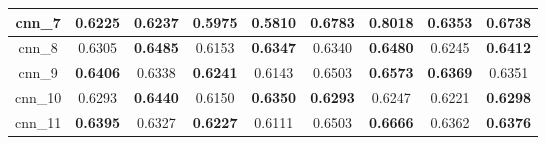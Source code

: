 \begin{table}[hp]
\begin{tabular} {|c|c|c|c|c|c|c|c|c| }
        cnn\_7   & 0.6225                              & \textbf{0.6237}                     & \textbf{0.5975}                     & 0.5810                              & 0.6783                              & \textbf{\cellcolor{green!50}0.8018} & 0.6353                              & \textbf{0.6738}                     \\ \hline
        cnn\_8   & 0.6305                              & \textbf{0.6485}                     & 0.6153                              & \textbf{0.6347}                     & 0.6340                              & \textbf{0.6480}                     & 0.6245                              & \textbf{0.6412}                     \\ \hline
        cnn\_9   & \textbf{0.6406}                     & 0.6338                              & \textbf{0.6241}                     & 0.6143                              & 0.6503                              & \textbf{0.6573}                     & \textbf{0.6369}                     & 0.6351                              \\ \hline
        cnn\_10  & 0.6293                              & \textbf{0.6440}                     & 0.6150                              & \textbf{0.6350}                     & \textbf{0.6293}                     & 0.6247                              & 0.6221                              & \textbf{0.6298}                     \\ \hline
        cnn\_11  & \textbf{0.6395}                     & 0.6327                              & \textbf{0.6227}                     & 0.6111                              & 0.6503                              & \textbf{0.6666}                     & 0.6362                              & \textbf{0.6376}                     \\ \hline
    \end{tabular}
\end{table}



